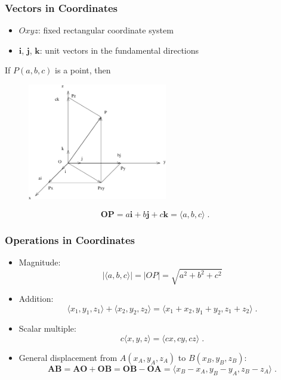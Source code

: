 \begin{frame}
 \frametitle{Vectors in Coordinates}

  \begin{itemize}
    \item $Oxyz$: fixed rectangular coordinate system
    \item $\textbf{i}$, $\textbf{j}$, $\textbf{k}$: unit vectors in the fundamental directions
  \end{itemize}

If $P(a,b,c)$ is a point, then
\begin{figure}[h]
  \includegraphics[height=2in]{../../modules/vectors/pictures/ok-vector_decomposition.eps}
\end{figure}
%
$$\textbf{OP} = a\textbf{i}+b\textbf{j}+c\textbf{k} = \langle a, b, c\rangle\; .$$

\end{frame}
\begin{frame}
\frametitle{Operations in Coordinates}

\begin{itemize}
 \item Magnitude:
%
$$|\langle a, b, c \rangle| = |OP| = \sqrt{a^2+b^2+c^2}$$
%
\item Addition:
%
$$\langle x_1,y_1,z_1 \rangle + \langle x_2, y_2,z_2\rangle = \langle x_1+x_2, y_1+y_2, z_1+z_2\rangle\; .$$
%
\item Scalar multiple:
%
$$c\langle x, y, z\rangle = \langle cx, cy, cz\rangle\; .$$
%
\item General displacement from $A(x_A, y_A, z_A)$ to $B(x_B, y_B, z_B)$:
%
$$\textbf{AB} = \textbf{AO} +\textbf{OB} = \textbf{OB} - \textbf{OA} = \langle x_B-x_A, y_B-y_A, z_B-z_A\rangle \; .$$
\end{itemize}

\end{frame}